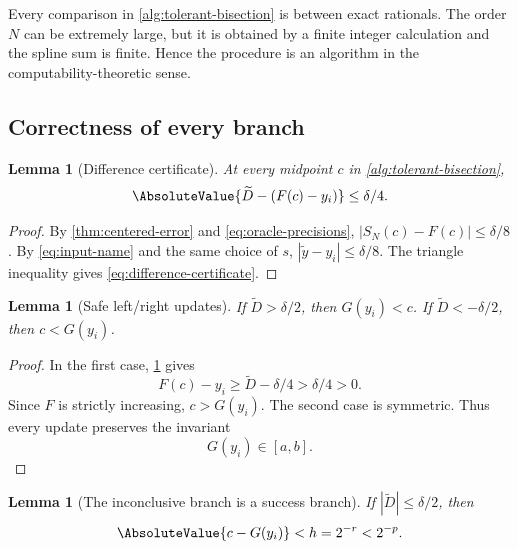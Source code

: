 \documentclass[11pt,oneside]{article}
\newtheorem{lemma}[theorem]{Lemma}
\theoremstyle{definition}
\theoremstyle{remark}
\numberwithin{equation}{section}
\begin{document}
Every comparison in \cref{alg:tolerant-bisection} is between exact rationals.
The order $N$ can be extremely large, but it is obtained by a finite integer
calculation and the spline sum is finite.  Hence the procedure is an algorithm
in the computability-theoretic sense.

\subsection{Correctness of every branch}

\begin{lemma}[Difference certificate]\label{lem:difference-certificate}
At every midpoint $c$ in \cref{alg:tolerant-bisection},
\begin{equation}\label{eq:difference-certificate}
 \AbsoluteValue{\widetilde D-(F(c)-y_i)}\le\delta/4.
\end{equation}
\end{lemma}

\begin{proof}
By \cref{thm:centered-error} and \eqref{eq:oracle-precisions},
$|S_N(c)-F(c)|\le\delta/8$.  By \eqref{eq:input-name} and the same choice of
$s$, $|\widetilde y-y_i|\le\delta/8$.  The triangle inequality gives
\eqref{eq:difference-certificate}.
\end{proof}

\begin{lemma}[Safe left/right updates]\label{lem:safe-updates}
If $\widetilde D>\delta/2$, then $G(y_i)<c$.  If
$\widetilde D<-\delta/2$, then $c<G(y_i)$.
\end{lemma}

\begin{proof}
In the first case, \cref{lem:difference-certificate} gives
\[
 F(c)-y_i\ge\widetilde D-\delta/4>\delta/4>0.
\]
Since $F$ is strictly increasing, $c>G(y_i)$.  The second case is symmetric.
Thus every update preserves the invariant
\begin{equation}\label{eq:bracket-invariant}
 G(y_i)\in[a,b].
\end{equation}
\end{proof}

\begin{lemma}[The inconclusive branch is a success branch]\label{lem:near-branch}
If $|\widetilde D|\le\delta/2$, then
\begin{equation}\label{eq:near-output}
 \AbsoluteValue{c-G(y_i)}<h=2^{-r}<2^{-p}.
\end{equation}
\end{lemma}
\end{document}

